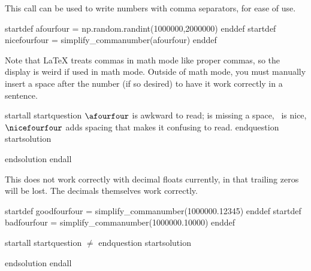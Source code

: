 
This call can be used to write numbers with comma separators, for ease of use.

startdef afourfour = np.random.randint(1000000,2000000) enddef
startdef nicefourfour = simplify_commanumber(afourfour) enddef

Note that LaTeX treats commas in math mode like proper commas, so the display is weird if used in math mode. Outside of math mode, you must manually insert a space after the number (if so desired) to have it work correctly in a sentence. 

startall
startquestion $\afourfour$ is awkward to read; \nicefourfour is missing a space, \nicefourfour\ is nice, $\nicefourfour$ adds spacing that makes it confusing to read. endquestion
startsolution \item  endsolution
endall

This does not work correctly with decimal floats currently, in that trailing zeros will be lost. The decimals themselves work correctly.

startdef goodfourfour = simplify_commanumber(1000000.12345) enddef
startdef badfourfour = simplify_commanumber(1000000.10000) enddef

startall
startquestion  \goodfourfour $\neq$ \badfourfour endquestion
startsolution \item  endsolution
endall
